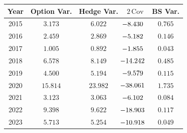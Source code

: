 \begingroup
\renewcommand{\arraystretch}{1.12}
\setlength{\tabcolsep}{6.0pt}
\begin{tabular}{@{}ccccc@{}}
\toprule
Year & Option Var. & Hedge Var. & $2\,\mathrm{Cov}$ & BS Var. \\
\midrule
2015 & $3.173$ & $6.022$ & $\mathllap{-}8.430$ & $0.765$ \\
2016 & $2.459$ & $2.869$ & $\mathllap{-}5.182$ & $0.146$ \\
2017 & $1.005$ & $0.892$ & $\mathllap{-}1.855$ & $0.043$ \\
2018 & $6.578$ & $8.149$ & $\mathllap{-}14.242$ & $0.485$ \\
2019 & $4.500$ & $5.194$ & $\mathllap{-}9.579$ & $0.115$ \\
2020 & $15.814$ & $23.982$ & $\mathllap{-}38.061$ & $1.735$ \\
2021 & $3.123$ & $3.063$ & $\mathllap{-}6.102$ & $0.084$ \\
2022 & $9.398$ & $9.622$ & $\mathllap{-}18.903$ & $0.117$ \\
2023 & $5.713$ & $5.254$ & $\mathllap{-}10.918$ & $0.049$ \\
\bottomrule
\end{tabular}
\endgroup
